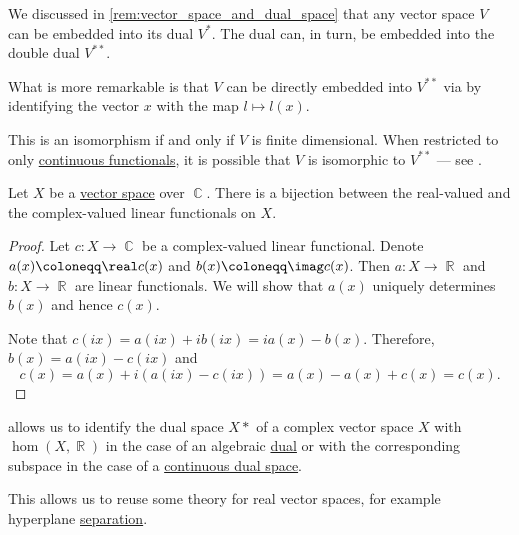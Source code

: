 \begin{remark}\label{rem:double_dual}
  We discussed in \cref{rem:vector_space_and_dual_space} that any vector space \( V \) can be embedded into its dual \( V^* \). The dual can, in turn, be embedded into the double dual \( V^{**} \).

  What is more remarkable is that \( V \) can be directly embedded into \( V^{**} \) via by identifying the vector \( x \) with the map \( l \mapsto l(x) \).

  This is an isomorphism if and only if \( V \) is finite dimensional. When restricted to only \hyperref[def:continuous_dual_space]{continuous functionals}, it is possible that \( V \) is isomorphic to \( V^{**} \) --- see .
\end{remark}

\begin{theorem}\label{thm:linear_functionals_over_c}
  Let \( X \) be a \hyperref[def:vector_space]{vector space} over \( \BbbC \). There is a bijection between the real-valued and the complex-valued linear functionals on \( X \).
\end{theorem}
\begin{proof}
  Let \( c: X \to \BbbC \) be a complex-valued linear functional. Denote \( a(x) \coloneqq \real c(x) \) and \( b(x) \coloneqq \imag c(x) \). Then \( a: X \to \BbbR \) and \( b: X \to \BbbR \) are linear functionals. We will show that \( a(x) \) uniquely determines \( b(x) \) and hence \( c(x) \).

  Note that \( c(ix) = a(ix) + i b(ix) = i a(x) - b(x) \). Therefore, \( b(x) = a(ix) - c(ix) \) and
  \begin{equation*}
    c(x) = a(x) + i (a(ix) - c(ix)) = a(x) - a(x) + c(x) = c(x).
  \end{equation*}
\end{proof}

\begin{remark}\label{rem:linear_functionals_over_c}
   allows us to identify the dual space \( X* \) of a complex vector space \( X \) with \( \hom(X, \BbbR) \) in the case of an algebraic \hyperref[def:dual_vector_space]{dual} or with the corresponding subspace in the case of a \hyperref[def:continuous_dual_space]{continuous dual space}.

  This allows us to reuse some theory for real vector spaces, for example hyperplane \hyperref[def:hyperplane_separation]{separation}.
\end{remark}
